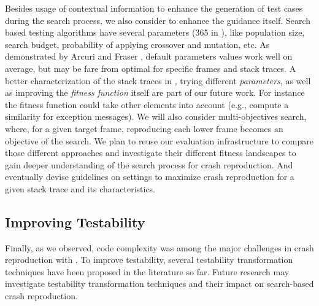 Besides usage of contextual information to enhance the generation of test cases during the search process, we also consider to enhance the guidance itself.
Search based testing algorithms have several parameters (365 in \evocrash), like population size, search budget, probability of applying crossover and mutation, etc. 
As demonstrated by Arcuri and Fraser \cite{Arcuri2011a}, default parameters values work well on average, but may be fare from optimal for specific frames and stack traces. 
A better characterization of the stack traces in \crashpack, trying different \emph{parameters}, as well as improving the \emph{fitness function} itself are part of our future work.
For instance the fitness function could take other elements into account (e.g., compute a similarity for exception messages).
We will also consider multi-objectives search, where, for a given target frame, reproducing each lower  frame becomes an objective of the search.
We plan to reuse our evaluation infrastructure to compare those different approaches and investigate their different fitness landscapes to gain deeper understanding of the search process for crash reproduction. And eventually devise guidelines on \evocrash settings to maximize crash reproduction for a given stack trace and its characteristics.

\subsection{Improving Testability}

Finally, as we observed, code complexity was among the major challenges in crash reproduction with \evocrash.
To improve testability, several testability transformation techniques \cite{McMinn2011, LiBytecodeTT, MarkFlag,MarkFlagRemoval, MarkLoopFlag} have been proposed in the literature so far.
Future research may investigate testability transformation techniques and their impact on search-based crash reproduction.
